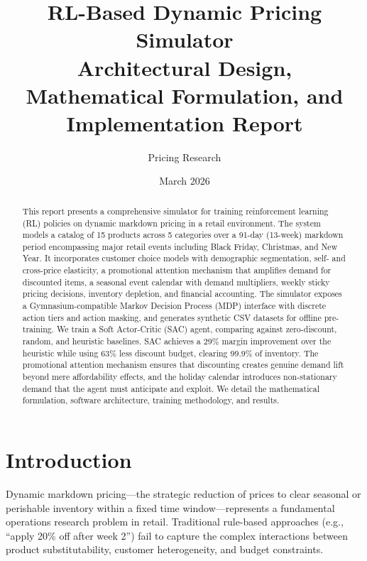 \documentclass[11pt,a4paper]{article}
\title{%
    \textbf{RL-Based Dynamic Pricing Simulator}\\[6pt]
    \large Architectural Design, Mathematical Formulation, and Implementation Report
}
\author{Pricing Research}
\date{March 2026}
\begin{document}
\maketitle

\begin{abstract}
This report presents a comprehensive simulator for training reinforcement learning (RL) policies on dynamic markdown pricing in a retail environment.
The system models a catalog of 15 products across 5 categories over a 91-day (13-week) markdown period encompassing major retail events including Black Friday, Christmas, and New Year.
It incorporates customer choice models with demographic segmentation, self- and cross-price elasticity, a promotional attention mechanism that amplifies demand for discounted items, a seasonal event calendar with demand multipliers, weekly sticky pricing decisions, inventory depletion, and financial accounting.
The simulator exposes a Gymnasium-compatible Markov Decision Process (MDP) interface with discrete action tiers and action masking, and generates synthetic CSV datasets for offline pre-training.
We train a Soft Actor-Critic (SAC) agent, comparing against zero-discount, random, and heuristic baselines.
SAC achieves a 29\% margin improvement over the heuristic while using 63\% less discount budget, clearing 99.9\% of inventory.
The promotional attention mechanism ensures that discounting creates genuine demand lift beyond mere affordability effects, and the holiday calendar introduces non-stationary demand that the agent must anticipate and exploit.
We detail the mathematical formulation, software architecture, training methodology, and results.
\end{abstract}

\tableofcontents
\newpage

\section{Introduction}

Dynamic markdown pricing---the strategic reduction of prices to clear seasonal or perishable inventory within a fixed time window---represents a fundamental operations research problem in retail.
Traditional rule-based approaches (e.g., ``apply 20\% off after week 2'') fail to capture the complex interactions between product substitutability, customer heterogeneity, and budget constraints.
\end{document}
